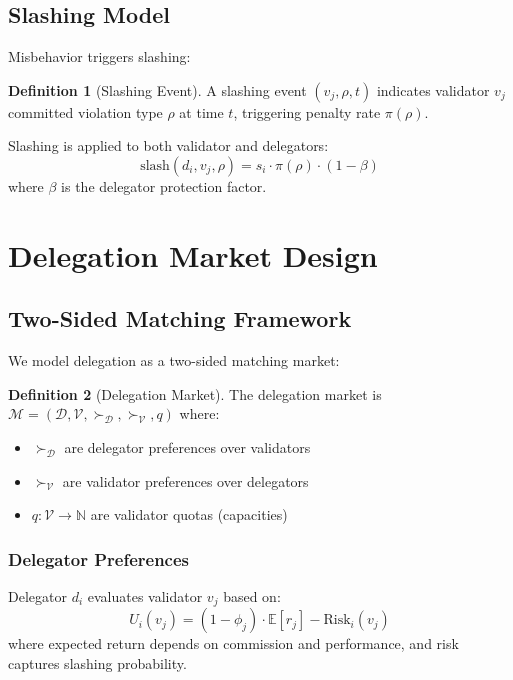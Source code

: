 \documentclass[11pt,a4paper]{article}
\theoremstyle{definition}
\newtheorem{definition}{Definition}[section]
\theoremstyle{remark}
\begin{document}
\subsection{Slashing Model}

Misbehavior triggers slashing:

\begin{definition}[Slashing Event]
A slashing event $(v_j, \rho, t)$ indicates validator $v_j$ committed violation type $\rho$ at time $t$, triggering penalty rate $\pi(\rho)$.
\end{definition}

Slashing is applied to both validator and delegators:
\begin{equation}
    \text{slash}(d_i, v_j, \rho) = s_i \cdot \pi(\rho) \cdot (1 - \beta)
\end{equation}
where $\beta$ is the delegator protection factor.

\section{Delegation Market Design}

\subsection{Two-Sided Matching Framework}

We model delegation as a two-sided matching market:

\begin{definition}[Delegation Market]
The delegation market is $\mathcal{M} = (\mathcal{D}, \mathcal{V}, \succ_{\mathcal{D}}, \succ_{\mathcal{V}}, q)$ where:
\begin{itemize}
    \item $\succ_{\mathcal{D}}$ are delegator preferences over validators
    \item $\succ_{\mathcal{V}}$ are validator preferences over delegators
    \item $q: \mathcal{V} \to \mathbb{N}$ are validator quotas (capacities)
\end{itemize}
\end{definition}

\subsubsection{Delegator Preferences}

Delegator $d_i$ evaluates validator $v_j$ based on:
\begin{equation}
    U_i(v_j) = (1 - \phi_j) \cdot \mathbb{E}[r_j] - \text{Risk}_i(v_j)
\end{equation}
where expected return depends on commission and performance, and risk captures slashing probability.
\end{document}
